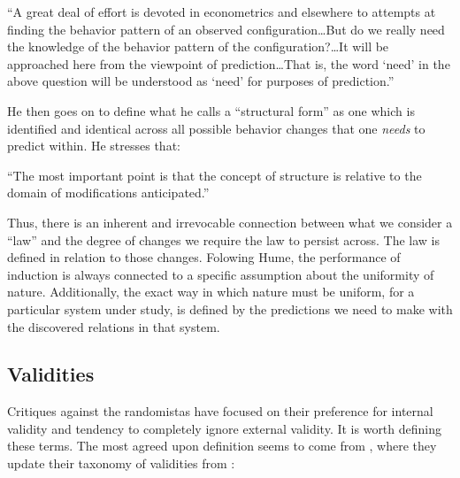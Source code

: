 \documentclass[a4paper,12pt]{article}
\begin{document}
\begin{displayquote}
``A great deal of effort is devoted in econometrics and elsewhere to attempts at finding the behavior pattern of an observed configuration\ldots But do we really need the knowledge of the behavior pattern of the configuration?\ldots It will be approached here from the viewpoint of prediction\ldots That is, the word `need' in the above question will be understood as `need' for purposes of prediction.''
\end{displayquote}


He then goes on to define what he calls a ``structural form'' as one which is identified and identical across all possible behavior changes that one \textit{needs} to predict within. He stresses that: 

\begin{displayquote}
``The most important point is that the concept of structure is relative to the domain of modifications anticipated.''  
\end{displayquote}

Thus, there is an inherent and irrevocable connection between what we consider a ``law'' and the degree of changes we require the law to persist across. The law is defined in relation to those changes. Folowing Hume, the performance of induction is always connected to a specific assumption about the uniformity of nature. Additionally, the exact way in which nature must be uniform, for a particular system under study, is defined by the predictions we need to make with the discovered relations in that system. 

\subsection*{Validities}

Critiques against the randomistas have focused on their preference for internal validity and tendency to completely ignore external validity. It is worth defining these terms. The most agreed upon definition seems to come from \cite{Shadish2002}, where they update their taxonomy of validities from \cite{Cook1979}:
\end{document}
